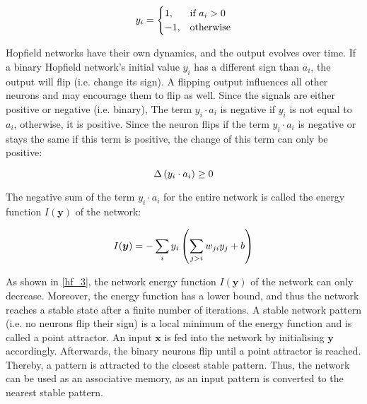 \begin{equation}\eqlbl{hf_2}
	y_i = \begin{cases}
      		1, & \text{if } a_i > 0 \\
      		-1, & \text{otherwise}
    	\end{cases}
\end{equation}


Hopfield networks have their own dynamics, and the output evolves over time.
If a binary Hopfield network's initial value \(y_i\) has a different sign than $a_i$, the output will flip (i.e. change its sign).
A flipping output influences all other neurons and may encourage them to flip as well.
Since the signals are either positive or negative (i.e. binary), The term \(y_i \cdot a_i\) is negative if \(y_i\) is not equal to \(a_i\), otherwise, it is positive.
Since the neuron flips if the term \(y_i \cdot a_i\) is negative or stays the same if this term is positive, the change of this term can only be positive:

\begin{equation}\eqlbl{hf_3}
	\Delta \left( y_i \cdot a_i \right) \geq 0
\end{equation}

The negative sum of the term $y_i \cdot a_i$ for the entire network is called the energy function $I(\boldsymbol{y})$ of the network:

\begin{equation}\eqlbl{hf_4}
	I(\boldsymbol{y}) = -\sum_{i} y_i \left( \sum_{j>i} w_{ji} y_j + b \right)
\end{equation}

As shown in \eqref{hf_3}, the network energy function \(I(\boldsymbol{y})\) of the network can only decrease.
Moreover, the energy function has a lower bound, and thus the network reaches a stable state after a finite number of iterations. 
A stable network pattern (i.e. no neurons flip their sign) is a local minimum of the energy function and is called a point attractor.
An input $\boldsymbol{x}$ is fed into the network by initialising $\boldsymbol{y}$ accordingly.
Afterwards, the binary neurons flip until a point attractor is reached. Thereby, a pattern is attracted to the closest stable pattern.
Thus, the network can be used as an associative memory, as an input pattern is converted to the nearest stable pattern.













